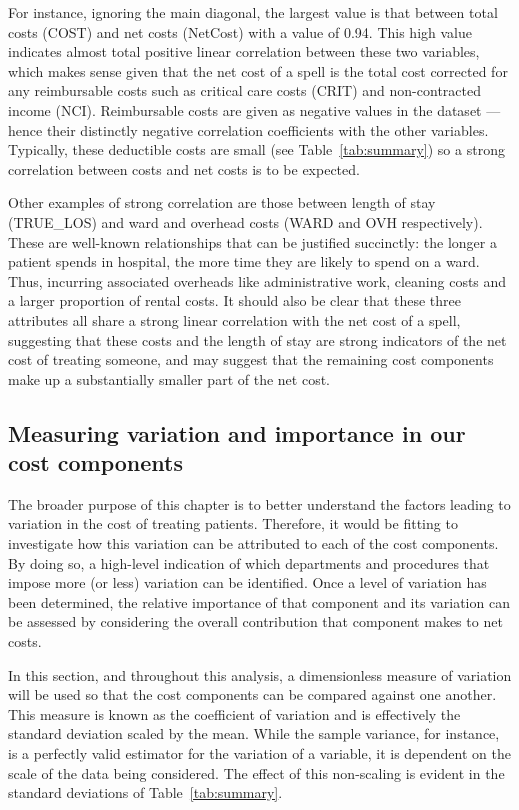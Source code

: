 For instance, ignoring the main diagonal, the largest value is that between
total costs (COST) and net costs (NetCost) with a value of 0.94. This high value
indicates almost total positive linear correlation between these two variables,
which makes sense given that the net cost of a spell is the total cost corrected
for any reimbursable costs such as critical care costs (CRIT) and non-contracted
income (NCI). Reimbursable costs are given as negative values in the dataset ---
hence their distinctly negative correlation coefficients with the other
variables. Typically, these deductible costs are small
(see Table~\ref{tab:summary}) so a strong correlation between costs and net
costs is to be expected.

Other examples of strong correlation are those between length of stay
(TRUE\_LOS) and ward and overhead costs (WARD and OVH respectively). These are
well-known relationships that can be justified succinctly: the longer a patient
spends in hospital, the more time they are likely to spend on a ward. Thus,
incurring associated overheads like administrative work, cleaning costs and a
larger proportion of rental costs. It should also be clear that these three
attributes all share a strong linear correlation with the net cost of a spell,
suggesting that these costs and the length of stay are strong indicators of the
net cost of treating someone, and may suggest that the remaining cost components
make up a substantially smaller part of the net cost.


\subsection{Measuring variation and importance in our cost components}

The broader purpose of this chapter is to better understand the factors leading
to variation in the cost of treating patients. Therefore, it would be fitting to
investigate how this variation can be attributed to each of the cost components.
By doing so, a high-level indication of which departments and procedures that
impose more (or less) variation can be identified. Once a level of variation has
been determined, the relative importance of that component and its variation can
be assessed by considering the overall contribution that component makes to net
costs.

In this section, and throughout this analysis, a dimensionless measure of
variation will be used so that the cost components can be compared against one
another. This measure is known as the coefficient of variation and is
effectively the standard deviation scaled by the mean. While the sample
variance, for instance, is a perfectly valid estimator for the variation of a
variable, it is dependent on the scale of the data being considered. The effect
of this non-scaling is evident in the standard deviations of
Table~\ref{tab:summary}.

